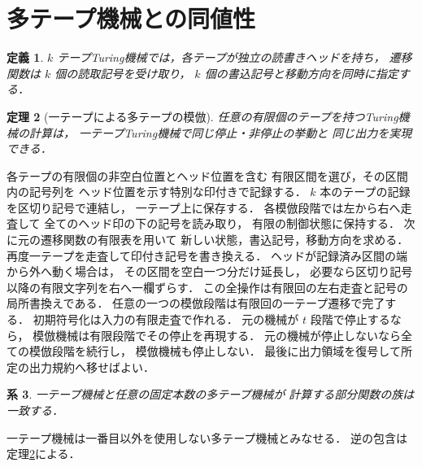 \documentclass[a5paper,10pt,onecolumn]{jsarticle}
\makeatletter
\theoremstyle{mathnotetheorem}
\newtheorem{theorem}{定理}[section]
\newtheorem{definition}[theorem]{定義}
\newtheorem{corollary}[theorem]{系}
\renewcommand{\proofname}{証明}
\renewenvironment{proof}[1][\proofname]{%
  \par\pushQED{\qed}\normalfont\topsep4\p@\@plus2\p@\relax
  \trivlist\item[\hskip\labelsep\bfseries #1]\ignorespaces
}{\popQED\endtrivlist\@endpefalse}
\makeatother
\begin{document}
\section{多テープ機械との同値性}
\begin{definition}
$k$ テープTuring機械では，各テープが独立の読書きヘッドを持ち，
遷移関数は $k$ 個の読取記号を受け取り，
$k$ 個の書込記号と移動方向を同時に指定する．
\end{definition}
\begin{theorem}[一テープによる多テープの模倣]\label{thm:multitape}
任意の有限個のテープを持つTuring機械の計算は，
一テープTuring機械で同じ停止・非停止の挙動と
同じ出力を実現できる．
\end{theorem}
\begin{proof}
各テープの有限個の非空白位置とヘッド位置を含む
有限区間を選び，その区間内の記号列を
ヘッド位置を示す特別な印付きで記録する．
$k$ 本のテープの記録を区切り記号で連結し，
一テープ上に保存する．
各模倣段階では左から右へ走査して
全てのヘッド印の下の記号を読み取り，
有限の制御状態に保持する．
次に元の遷移関数の有限表を用いて
新しい状態，書込記号，移動方向を求める．
再度一テープを走査して印付き記号を書き換える．
ヘッドが記録済み区間の端から外へ動く場合は，
その区間を空白一つ分だけ延長し，
必要なら区切り記号以降の有限文字列を右へ一欄ずらす．
この全操作は有限回の左右走査と記号の局所書換えである．
任意の一つの模倣段階は有限回の一テープ遷移で完了する．
初期符号化は入力の有限走査で作れる．
元の機械が $t$ 段階で停止するなら，
模倣機械は有限段階でその停止を再現する．
元の機械が停止しないなら全ての模倣段階を続行し，
模倣機械も停止しない．
最後に出力領域を復号して所定の出力規約へ移せばよい．
\end{proof}
\begin{corollary}
一テープ機械と任意の固定本数の多テープ機械が
計算する部分関数の族は一致する．
\end{corollary}
\begin{proof}
一テープ機械は一番目以外を使用しない多テープ機械とみなせる．
逆の包含は定理\ref{thm:multitape}による．
\end{proof}
\end{document}
